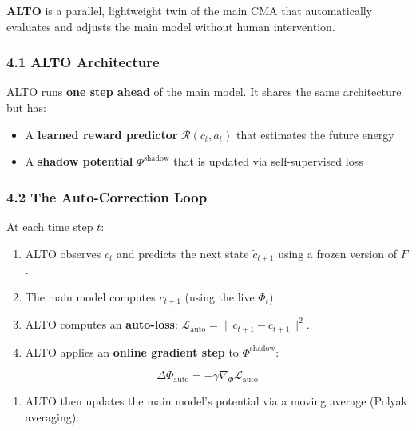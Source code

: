 \documentclass[
  11pt,
  a4paper,
]{article}
\providecommand{\tightlist}{%
  \setlength{\itemsep}{0pt}\setlength{\parskip}{0pt}}
\begin{document}
\textbf{ALTO} is a parallel, lightweight twin of the main CMA that
automatically evaluates and adjusts the main model without human
intervention.

\subsubsection{4.1 ALTO Architecture}\label{alto-architecture}

ALTO runs \textbf{one step ahead} of the main model. It shares the same
architecture but has:

\begin{itemize}
\tightlist
\item
  A \textbf{learned reward predictor} \(\mathcal{R}(c_t, a_t)\) that
  estimates the future energy
\item
  A \textbf{shadow potential} \(\Phi^{\text{shadow}}\) that is updated
  via self-supervised loss
\end{itemize}

\subsubsection{4.2 The Auto-Correction
Loop}\label{the-auto-correction-loop}

At each time step \(t\):

\begin{enumerate}
\def\labelenumi{\arabic{enumi}.}
\tightlist
\item
  ALTO observes \(c_t\) and predicts the next state \(\tilde{c}_{t+1}\)
  using a frozen version of \(F\).
\item
  The main model computes \(c_{t+1}\) (using the live \(\Phi_t\)).
\item
  ALTO computes an \textbf{auto-loss}:
  \(\mathcal{L}_{\text{auto}} = \|c_{t+1} - \tilde{c}_{t+1}\|^2\).
\item
  ALTO applies an \textbf{online gradient step} to
  \(\Phi^{\text{shadow}}\):
\end{enumerate}

\[\Delta \Phi_{\text{auto}} = -\gamma \nabla_{\Phi} \mathcal{L}_{\text{auto}}\]

\begin{enumerate}
\def\labelenumi{\arabic{enumi}.}
\setcounter{enumi}{4}
\tightlist
\item
  ALTO then updates the main model's potential via a moving average
  (Polyak averaging):
\end{enumerate}
\end{document}
